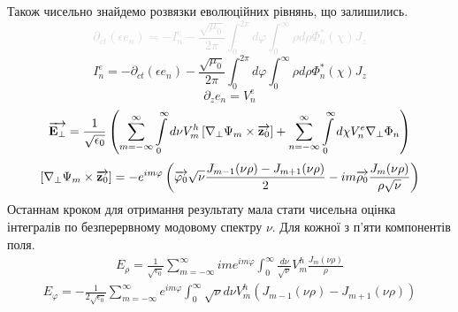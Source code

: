 %
Також чисельно знайдемо розвязки еволюційних рівнянь, що залишились.
%
\textcolor{lightgray}{ \begin{equation*}
\partial_{ct} (\epsilon e_n) = - I_n^e - 
\frac{\sqrt{\mu_0}}{2 \pi} \int_0^{2\pi} d \varphi 
\int_0^{\infty} \rho d \rho \Phi_n^* (\chi) J_z
\end{equation*} }
%
\begin{equation*}
I_n^e = - \partial_{ct} (\epsilon e_n) - 
\frac{\sqrt{\mu_0}}{2 \pi} \int_0^{2\pi} d \varphi 
\int_0^{\infty} \rho d \rho \Phi_n^* (\chi) J_z
\end{equation*}
%
\begin{equation*}
\partial_{z} e_n = V_n^e
\end{equation*}
%
\textcolor{lightgray} { \begin{equation*} \begin{aligned}
\overrightarrow{\mathbf E_\perp} = \frac{1}{\sqrt{\epsilon_0}} \left( 
\sum \limits_{m=-\infty}^{\infty} \int \limits_{0}^{\infty} 
d \nu V_m^h \left[  \nabla_\perp \Psi_m  \times  \overrightarrow{\mathbf z_0}  \right] +
\sum \limits_{n=-\infty}^{\infty} \int \limits_{0}^{\infty}
d \chi V_n^e \nabla_\perp \Phi_n \right)
\end{aligned} \end{equation*} }
%
\textcolor{lightgray} { \begin{equation*} \begin{aligned}
\left[  \nabla_\perp \Psi_m  \times  \overrightarrow{\mathbf z_0}  \right] = 
- e^{im\varphi} \left( \overrightarrow{\mathbf \varphi_0} \sqrt{\nu} 
\frac{J_{m-1} (\nu \rho) - J_{m+1} (\nu \rho)}{2} - 
i m \overrightarrow{\mathbf \rho_0} \frac{J_m (\nu \rho)}{ \rho \sqrt{\nu}} \right)
\end{aligned} \end{equation*} }
%
Останнам кроком для отримання результату мала стати чисельна оцінка 
інтегралів по безперервному модовому спектру $ \nu $. Для кожної з п'яти
компонентів поля.
%
\begin{equation*} \begin{aligned} \label{eq:KerrAmendErhoInit}
E_\rho = \frac{1}{\sqrt{\epsilon_0}} \sum_{m=-\infty}^{\infty} 
i m e^{im\varphi} \int_{0}^{\infty} \frac{d \nu}{\sqrt{\nu}} 
V_m^h \frac{J_m(\nu \rho)}{\rho}
\end{aligned} \end{equation*}
%
\begin{equation*} \begin{aligned}
E_\varphi = - \frac{1}{2 \sqrt{\epsilon_0}} \sum_{m=-\infty}^{\infty} 
e^{im\varphi} \int_{0}^{\infty} \sqrt{\nu} d \nu 
V_m^h \left( J_{m-1} (\nu \rho) - J_{m+1} (\nu \rho) \right)
\end{aligned} \end{equation*}
